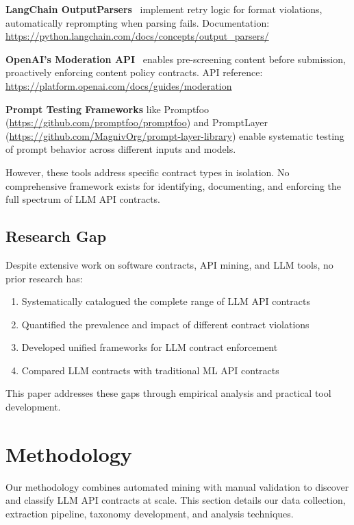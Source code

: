 \documentclass[11pt]{article}
\begin{document}
\textbf{LangChain OutputParsers}~\cite{langchain2023} implement retry logic for format violations, automatically reprompting when parsing fails. Documentation: \url{https://python.langchain.com/docs/concepts/output_parsers/}

\textbf{OpenAI's Moderation API}~\cite{openai2023moderation} enables pre-screening content before submission, proactively enforcing content policy contracts. API reference: \url{https://platform.openai.com/docs/guides/moderation}

\textbf{Prompt Testing Frameworks} like Promptfoo~\cite{promptfoo2023} (\url{https://github.com/promptfoo/promptfoo}) and PromptLayer~\cite{promptlayer2023} (\url{https://github.com/MagnivOrg/prompt-layer-library}) enable systematic testing of prompt behavior across different inputs and models.

However, these tools address specific contract types in isolation. No comprehensive framework exists for identifying, documenting, and enforcing the full spectrum of LLM API contracts.

\subsection{Research Gap}

Despite extensive work on software contracts, API mining, and LLM tools, no prior research has:
\begin{enumerate}
    \item Systematically catalogued the complete range of LLM API contracts
    \item Quantified the prevalence and impact of different contract violations
    \item Developed unified frameworks for LLM contract enforcement
    \item Compared LLM contracts with traditional ML API contracts
\end{enumerate}

This paper addresses these gaps through empirical analysis and practical tool development.

\section{Methodology}
\label{sec:methodology}

Our methodology combines automated mining with manual validation to discover and classify LLM API contracts at scale. This section details our data collection, extraction pipeline, taxonomy development, and analysis techniques.
\end{document}
